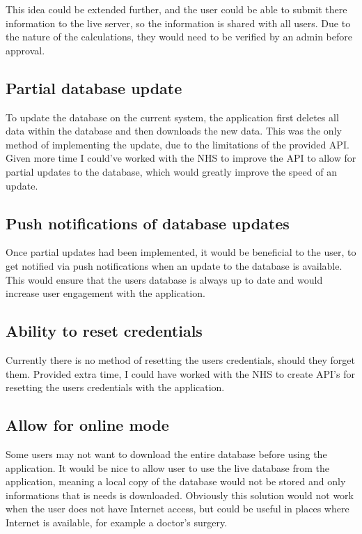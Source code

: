 This idea could be extended further, and the user could be able to submit there information to the live server, so the information is shared with all users. Due to the nature of the calculations, they would need to be verified by an admin before approval.

\subsection{Partial database update}

To update the database on the current system, the application first deletes all data within the database and then downloads the new data. This was the only method of implementing the update, due to the limitations of the provided API. Given more time I could’ve worked with the NHS to improve the API to allow for partial updates to the database, which would greatly improve the speed of an update.

\subsection{Push notifications of database updates}

Once partial updates had been implemented, it would be beneficial to the user, to get notified via push notifications when an update to the database is available.  This would ensure that the users database is always up to date and would increase user engagement with the application.

\subsection{Ability to reset credentials}

Currently there is no method of resetting the users credentials, should they forget them. Provided extra time, I could have worked with the NHS to create API’s for resetting the users credentials with the application.


\subsection{Allow for online mode}

Some users may not want to download the entire database before using the application. It would be nice to allow user to use the live database from the application, meaning a local copy of the database would not be stored and only informations that is needs is downloaded. Obviously this solution would not work when the user does not have Internet access, but could be useful in places where Internet is available, for example a doctor’s surgery.
